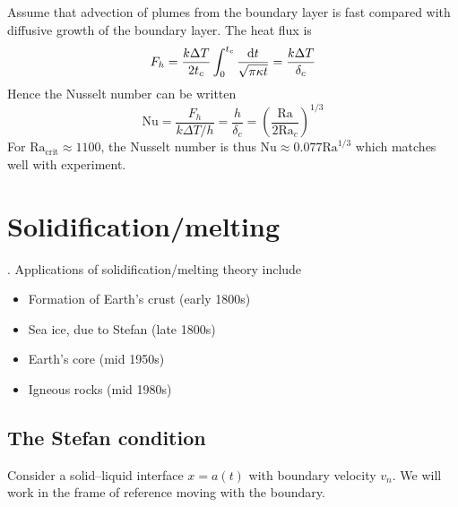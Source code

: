 \documentclass{jknotes}
\newcommand{\Ra}{\text{Ra}}
\begin{document}
Assume that advection of plumes from the boundary layer is fast compared with
diffusive growth of the boundary layer. The heat flux is
\begin{equation}
	F_h = \frac{k \Delta T}{2t_c} \int_0^{t_c} \frac{\diffd t}{\sqrt{\pi\kappa
	t}} = \frac{k\Delta T}{\delta_c}
\end{equation}
Hence the Nusselt number can be written
\begin{equation}
	\text{Nu} = \frac{F_h}{k\Delta T/h} = \frac{h}{\delta_c} = \left(
	\frac{\Ra}{2\Ra_c}\right)^{1/3}
\end{equation}
For $\Ra_{\text{crit}} \approx 1100$, the Nusselt number is thus $\text{Nu}
\approx 0.077 \Ra^{1/3}$ which matches well with experiment.

\section{Solidification/melting}.
Applications of solidification/melting theory include
\begin{itemize}
	\item Formation of Earth's crust (early 1800s)
	\item Sea ice, due to Stefan (late 1800s)
	\item Earth's core (mid 1950s)
	\item Igneous rocks (mid 1980s)
\end{itemize}

\subsection{The Stefan condition}
Consider a solid--liquid interface $x = a(t)$ with boundary velocity $v_n$. We
will work in the frame of reference moving with the boundary.
\begin{center}
\end{center}
\end{document}
